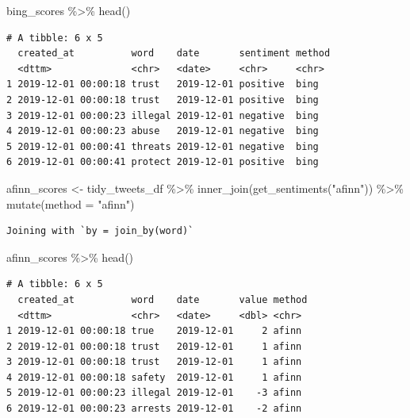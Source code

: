 \documentclass[
  letterpaper,
  DIV=11,
  numbers=noendperiod]{scrreprt}
\newenvironment{Shaded}{\begin{snugshade}}{\end{snugshade}}
\newcommand{\AttributeTok}[1]{\textcolor[rgb]{0.40,0.45,0.13}{#1}}
\newcommand{\FunctionTok}[1]{\textcolor[rgb]{0.28,0.35,0.67}{#1}}
\newcommand{\NormalTok}[1]{\textcolor[rgb]{0.00,0.23,0.31}{#1}}
\newcommand{\OtherTok}[1]{\textcolor[rgb]{0.00,0.23,0.31}{#1}}
\newcommand{\SpecialCharTok}[1]{\textcolor[rgb]{0.37,0.37,0.37}{#1}}
\newcommand{\StringTok}[1]{\textcolor[rgb]{0.13,0.47,0.30}{#1}}
\begin{document}
\begin{Shaded}
\begin{Highlighting}[]
\NormalTok{bing\_scores }\SpecialCharTok{\%\textgreater{}\%} \FunctionTok{head}\NormalTok{()}
\end{Highlighting}
\end{Shaded}

\begin{verbatim}
# A tibble: 6 x 5
  created_at          word    date       sentiment method
  <dttm>              <chr>   <date>     <chr>     <chr> 
1 2019-12-01 00:00:18 trust   2019-12-01 positive  bing  
2 2019-12-01 00:00:18 trust   2019-12-01 positive  bing  
3 2019-12-01 00:00:23 illegal 2019-12-01 negative  bing  
4 2019-12-01 00:00:23 abuse   2019-12-01 negative  bing  
5 2019-12-01 00:00:41 threats 2019-12-01 negative  bing  
6 2019-12-01 00:00:41 protect 2019-12-01 positive  bing  
\end{verbatim}

\begin{Shaded}
\begin{Highlighting}[]
\NormalTok{afinn\_scores }\OtherTok{\textless{}{-}}\NormalTok{ tidy\_tweets\_df }\SpecialCharTok{\%\textgreater{}\%}
  \FunctionTok{inner\_join}\NormalTok{(}\FunctionTok{get\_sentiments}\NormalTok{(}\StringTok{"afinn"}\NormalTok{)) }\SpecialCharTok{\%\textgreater{}\%}
  \FunctionTok{mutate}\NormalTok{(}\AttributeTok{method =} \StringTok{"afinn"}\NormalTok{)}
\end{Highlighting}
\end{Shaded}

\begin{verbatim}
Joining with `by = join_by(word)`
\end{verbatim}

\begin{Shaded}
\begin{Highlighting}[]
\NormalTok{afinn\_scores }\SpecialCharTok{\%\textgreater{}\%} \FunctionTok{head}\NormalTok{()}
\end{Highlighting}
\end{Shaded}

\begin{verbatim}
# A tibble: 6 x 5
  created_at          word    date       value method
  <dttm>              <chr>   <date>     <dbl> <chr> 
1 2019-12-01 00:00:18 true    2019-12-01     2 afinn 
2 2019-12-01 00:00:18 trust   2019-12-01     1 afinn 
3 2019-12-01 00:00:18 trust   2019-12-01     1 afinn 
4 2019-12-01 00:00:18 safety  2019-12-01     1 afinn 
5 2019-12-01 00:00:23 illegal 2019-12-01    -3 afinn 
6 2019-12-01 00:00:23 arrests 2019-12-01    -2 afinn 
\end{verbatim}
\end{document}
